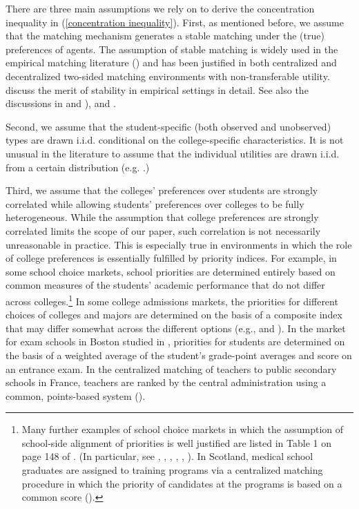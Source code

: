 \documentclass[12pt, fullpage]{amsart}
\theoremstyle{definition}
\theoremstyle{definition}
\theoremstyle{definition}
\begin{document}
\begin{bibunit}[econometrica]
    There are three main assumptions we rely on to derive the concentration inequality in (\ref{concentration inequality}). First, as mentioned before, we assume that the matching mechanism generates a stable matching under the (true) preferences of agents. The assumption of stable matching is widely used in the empirical matching literature (\cite{Chiappori/Salanie:16:JEL}) and has been justified in both centralized and decentralized two-sided matching environments with non-transferable utility.  \cite{Fack/Grenet/He:AER:2019} discuss the merit of stability in empirical settings in detail. See also the discussions in \cite{Menzel:2015:Eca} and \cite{He/Sinha/Sun:22:WP}), and \cite{Agarwal/Somaini:AnnRev:2020}. 
    
    Second, we assume that the student-specific (both observed and unobserved) types are drawn i.i.d. conditional on the college-specific characteristics. It is not unusual in the literature to assume that the individual utilities are drawn i.i.d. from a certain distribution (e.g. \cite{Menzel:2015:Eca}.) 
    
    Third, we assume that the colleges' preferences over students are strongly correlated while allowing students' preferences over  colleges to be fully heterogeneous. While the assumption that college preferences are strongly correlated limits the scope of our paper, such correlation is not necessarily unreasonable in practice. This is especially true in environments in which the role of college preferences is essentially fulfilled by priority indices. For example, in some school choice markets, school priorities  are determined entirely based on common measures of the students' academic performance that do not differ across colleges.\footnote{Many further examples of school choice markets in which the assumption of school-side alignment of priorities is well justified are listed in Table 1 on page 148 of \citet{Fack/Grenet/He:AER:2019}. (In particular, see \citet{Teo/Sethuraman/Tan:2001:MS}, \citet{Pathak/Sonmez:2013:AER}, \citet{Ajayi:2021:F-JHR}, \citet{PopEleches/Urquiola;2013:AER},  \citet{Artemov/Che/He:2017:WP}, \citet{Akyol/Krishna:2017:EER}). In Scotland, medical school graduates are assigned to training programs via a centralized matching procedure in which the priority of candidates at the programs is based on a common score (\citet{Irving:2011:MiP}).} In some college admissions markets, the priorities for different choices of colleges and majors  are determined on the basis of a composite index that may differ somewhat across the different options (e.g., \citet{Hastings/Neilson/Zimmerman:2013} and \citet{Kirkeboen/Leuven/Mogstad:16:QJE}). In the market for exam schools in Boston studied in \citet{Abdulkadiroglu/Angrist/Pathak:2014:ECTA},  priorities for students are determined on the basis of a weighted average of the student’s grade-point averages and score on an entrance exam. In the centralized matching of teachers to public secondary schools in France, teachers are  ranked by the central administration using a common, points-based system (\citet{Terrier:2011:MiP}). 
   

\end{bibunit}
\end{document}
